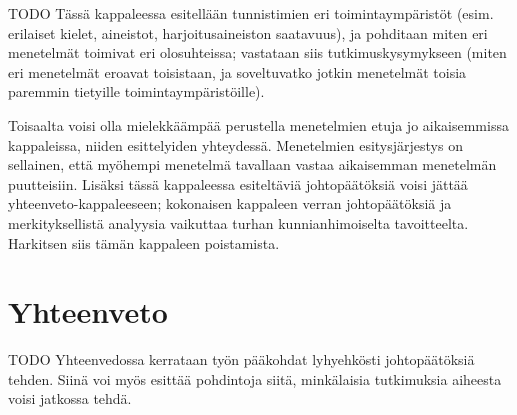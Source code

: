 \documentclass[utf8,bachelor,manualbib]{gradu3}
\begin{document}
TODO Tässä kappaleessa esitellään tunnistimien eri toimintaympäristöt (esim. erilaiset kielet, aineistot, harjoitusaineiston saatavuus), ja pohditaan miten eri menetelmät toimivat eri olosuhteissa; vastataan siis tutkimuskysymykseen (miten eri menetelmät eroavat toisistaan, ja soveltuvatko jotkin menetelmät toisia paremmin tietyille toimintaympäristöille).

Toisaalta voisi olla mielekkäämpää perustella menetelmien etuja jo aikaisemmissa kappaleissa, niiden esittelyiden yhteydessä. Menetelmien esitysjärjestys on sellainen, että myöhempi menetelmä tavallaan vastaa aikaisemman menetelmän puutteisiin.  Lisäksi tässä kappaleessa esiteltäviä johtopäätöksiä voisi jättää yhteenveto-kappaleeseen; kokonaisen kappaleen verran johtopäätöksiä ja merkityksellistä analyysia vaikuttaa turhan kunnianhimoiselta tavoitteelta.  Harkitsen siis tämän kappaleen poistamista.


\chapter{Yhteenveto}

TODO Yhteenvedossa kerrataan työn pääkohdat lyhyehkösti johtopäätöksiä tehden. Siinä voi myös esittää pohdintoja siitä, minkälaisia tutkimuksia aiheesta voisi jatkossa tehdä.
\end{document}
